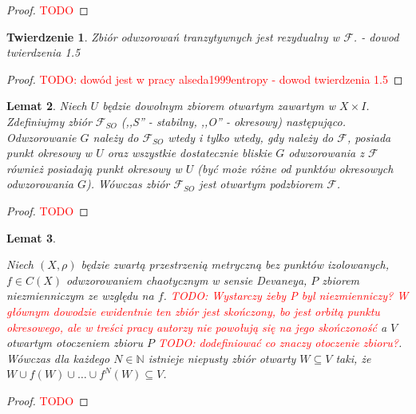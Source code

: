 \documentclass[licencjacka]{pwr_wmat_praca_dyplomowa}
\theoremstyle{plain}
\newtheorem{theorem}{Twierdzenie}
\numberwithin{theorem}{chapter}
\newtheorem{lemma}[theorem]{Lemat}
\theoremstyle{definition}
\numberwithin{theorem}{chapter}
\begin{document}
\begin{proof}
\textcolor{red}{TODO}
\end{proof}


\begin{theorem} \label{tranzytywne_rezydualne_w_F}
Zbiór odwzorowań tranzytywnych jest rezydualny w $\mathcal{F}$.
\cite{alseda1999entropy} - dowod twierdzenia 1.5
\end{theorem}

\begin{proof}
\textcolor{red}{TODO: dowód jest w pracy {alseda1999entropy} - dowod twierdzenia 1.5}
\end{proof}



\begin{lemma} \label{Fso_sa_otwartymi_podzbiorami_F}
Niech $U$ będzie dowolnym zbiorem otwartym zawartym w $X \times I$. Zdefiniujmy zbiór $\mathcal{F}_{SO}$ (,,S'' - stabilny, ,,O'' - okresowy) następująco. Odwzorowanie $G$ należy do $\mathcal{F}_{SO}$ wtedy i tylko wtedy, gdy należy do $\mathcal{F}$, posiada punkt okresowy w $U$ oraz wszystkie dostatecznie bliskie $G$ odwzorowania z $\mathcal{F}$ również posiadają punkt okresowy w $U$ (być może różne od punktów okresowych odwzorowania $G$).
Wówczas zbiór $\mathcal{F}_{SO}$ jest otwartym podzbiorem $\mathcal{F}$.
\end{lemma}

\begin{proof}
\textcolor{red}{TODO}
\end{proof}



\begin{lemma}
\label{w_otoczeniu_niezmienniczego_jest_otwarty_zawarty_w_iteracjach}

Niech $(X, \rho)$ będzie zwartą przestrzenią metryczną bez punktów izolowanych, $f \in C(X)$ odwzorowaniem chaotycznym w sensie Devaneya, $P$ zbiorem niezmienniczym ze względu na $f$. \textcolor{red}{TODO: Wystarczy żeby P byl niezmienniczy? W głównym dowodzie ewidentnie ten zbiór jest skończony, bo jest orbitą punktu okresowego, ale w treści pracy autorzy nie powołują się na jego skończoność} a $V$ otwartym otoczeniem zbioru $P$ \textcolor{red}{TODO: dodefiniować co znaczy otoczenie zbioru?}.
Wówczas dla każdego $N \in \mathbb{N}$ istnieje niepusty zbiór otwarty $W \subseteq V$ taki, że $W \cup f(W) \cup \ldots \cup f^N(W) \subseteq V$.
\end{lemma}

\begin{proof}
\textcolor{red}{TODO}
\end{proof}
\end{document}

